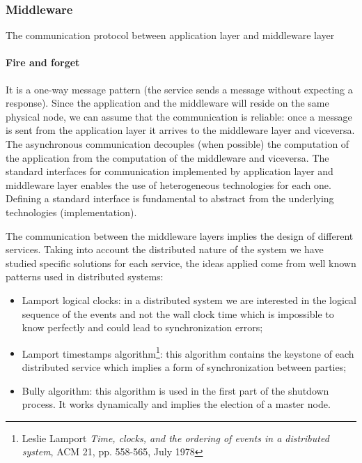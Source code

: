 \subsubsection{Middleware}
The communication protocol between application layer and middleware layer
\paragraph{Fire and forget}
It is a one-way message pattern (the service sends a message without expecting
a response). Since the application and the middleware will reside on the same
physical node, we can assume that the communication is reliable: once a message
is sent from the application layer it arrives to the middleware layer and
viceversa. The asynchronous communication decouples (when possible)
the computation of the application from the computation of the middleware
and viceversa. The standard interfaces for communication
implemented by application layer and middleware layer enables the use of
heterogeneous technologies for each one. Defining a standard interface
is fundamental to abstract from the underlying technologies (implementation).


The communication between the middleware layers implies the design of different
services. Taking into account the distributed nature of the system we have
studied specific solutions for each service, the ideas applied come from
well known patterns used in distributed systems:
\begin{itemize}
  \item Lamport logical clocks: in a distributed system we are interested
in the logical sequence of the events and not the wall clock time which is
impossible to know perfectly and could lead to synchronization errors;
  \item Lamport timestamps algorithm\footnote{Leslie Lamport \textit{Time,
clocks, and the ordering of events in a distributed system}, ACM 21,
pp. 558-565, July 1978}: this algorithm contains the keystone
of each distributed service which implies a form of synchronization
between parties;
  \item Bully algorithm: this algorithm is used in the first part of the
shutdown process. It works dynamically and implies the election of a master
node.
\end{itemize}

